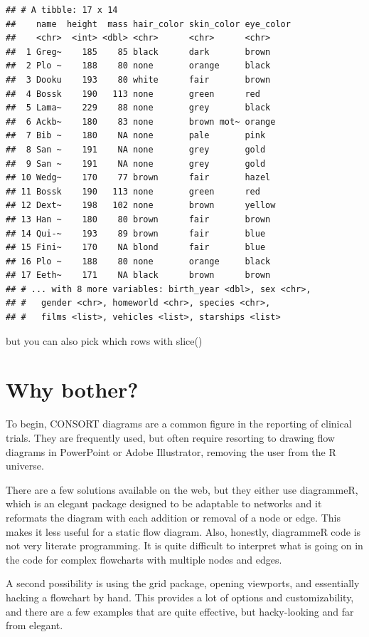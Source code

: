 \documentclass[
]{book}
\begin{document}
\begin{verbatim}
## # A tibble: 17 x 14
##    name  height  mass hair_color skin_color eye_color
##    <chr>  <int> <dbl> <chr>      <chr>      <chr>    
##  1 Greg~    185    85 black      dark       brown    
##  2 Plo ~    188    80 none       orange     black    
##  3 Dooku    193    80 white      fair       brown    
##  4 Bossk    190   113 none       green      red      
##  5 Lama~    229    88 none       grey       black    
##  6 Ackb~    180    83 none       brown mot~ orange   
##  7 Bib ~    180    NA none       pale       pink     
##  8 San ~    191    NA none       grey       gold     
##  9 San ~    191    NA none       grey       gold     
## 10 Wedg~    170    77 brown      fair       hazel    
## 11 Bossk    190   113 none       green      red      
## 12 Dext~    198   102 none       brown      yellow   
## 13 Han ~    180    80 brown      fair       brown    
## 14 Qui-~    193    89 brown      fair       blue     
## 15 Fini~    170    NA blond      fair       blue     
## 16 Plo ~    188    80 none       orange     black    
## 17 Eeth~    171    NA black      brown      brown    
## # ... with 8 more variables: birth_year <dbl>, sex <chr>,
## #   gender <chr>, homeworld <chr>, species <chr>,
## #   films <list>, vehicles <list>, starships <list>
\end{verbatim}

but you can also pick which rows with slice()

\hypertarget{why-bother}{%
\section{Why bother?}\label{why-bother}}

To begin, CONSORT diagrams are a common figure in the reporting of clinical trials. They are frequently used, but often require resorting to drawing flow diagrams in PowerPoint or Adobe Illustrator, removing the user from the R universe.

There are a few solutions available on the web, but they either use diagrammeR, which is an elegant package designed to be adaptable to networks and it reformats the diagram with each addition or removal of a node or edge. This makes it less useful for a static flow diagram. Also, honestly, diagrammeR code is not very literate programming. It is quite difficult to interpret what is going on in the code for complex flowcharts with multiple nodes and edges.

A second possibility is using the grid package, opening viewports, and essentially hacking a flowchart by hand. This provides a lot of options and customizability, and there are a few examples that are quite effective, but hacky-looking and far from elegant.
\end{document}
